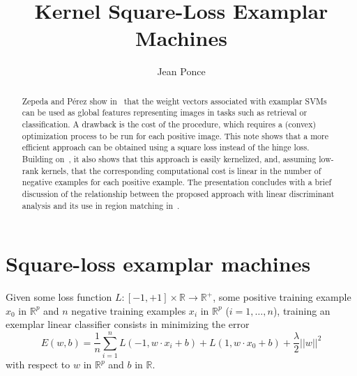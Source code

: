 \documentclass[12pt,letterpaper]{article}
\begin{document}
\def\RR{\mathbb{R}}
\def\PP{\mathbb{P}}
\def\AA{\mathbb{A}}
\def\LL{\mathbb{L}}
\def\SS{\mathbb{S}}
\def\barr{\bar{\mathbb{R}}}
\def\mat#1{{\mathcal{#1}}}
\def\vect#1{\mbox{\boldmath $#1$}}
\def\PPi{\mbox{\boldmath$\Pi$}}
\def\squig{\rightsquigarrow}
\def\comment#1{{}}
\def\qmatrix#1{\left[\begin{matrix}#1\end{matrix}\right]}
 
\title{Kernel Square-Loss Examplar Machines}
\author{Jean Ponce}
\maketitle
 
\begin{abstract}
Zepeda and P\'erez show in~\cite{ZePe15} that the weight vectors
associated with examplar SVMs can be used as global features
representing images in tasks such as retrieval or classification. A
drawback is the cost of the procedure, which requires a (convex)
optimization process to be run for each positive image. This note
shows that a more efficient approach can be obtained using a square
loss instead of the hinge loss. Building on~\cite{BaJo05,FiSc01}, it
also shows that this approach is easily kernelized, and, assuming
low-rank kernels, that the corresponding computational cost is linear
in the number of negative examples for each positive example. The
presentation concludes with a brief discussion of the relationship
between the proposed approach with linear discriminant analysis and
its use in region matching in~\cite{ARS14}.
\end{abstract}
 
 
\section{Square-loss examplar machines\label{sec:sqesvm}}
Given some loss function $L:[-1,+1]\times \RR\rightarrow \RR^+$, some
positive training example $x_0$ in $\RR^p$ and $n$ negative training
examples $x_i$ in $\RR^p$ ($i=1,\ldots,n$), training an exemplar
linear classifier consists in minimizing the error
\begin{equation}
E(w,b)=\frac{1}{n}\sum_{i=1}^n L(-1,w\cdot x_i+b)+ L(1,w\cdot
x_0+b)+\frac{\lambda}{2} ||w||^2
\label{eq:general}
\end{equation}
with respect to $w$ in $\RR^p$ and $b$ in $\RR$.
 
\end{document}

